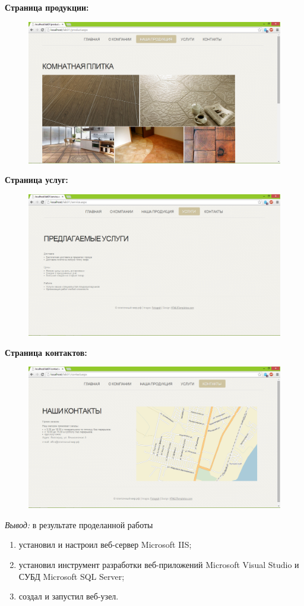 \documentclass[pscyr,12pt]{hedlab}
\begin{document}
  \textbf{Страница продукции:}
  \begin{figure}[h!]
    \center
    \includegraphics[width=.95\textwidth]{lab01_03}
  \end{figure}
  
  \newpage
  
  \textbf{Страница услуг:}
  \begin{figure}[h!]
    \center
    \includegraphics[width=.95\textwidth]{lab01_04}
  \end{figure}
  
  \textbf{Страница контактов:}
  \begin{figure}[h!]
    \center
    \includegraphics[width=.95\textwidth]{lab01_05}
  \end{figure}
  
  \emph{Вывод:} в результате проделанной работы
  \begin{enumerate}
    \item установил и настроил веб-сервер Microsoft IIS;
    \item установил инструмент разработки веб-приложений Microsoft Visual
      Studio и СУБД Microsoft SQL Server;
    \item создал и запустил веб-узел.
  \end{enumerate}
\end{document}
